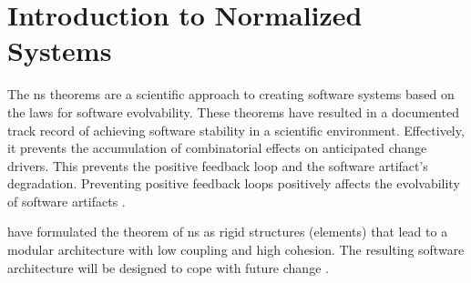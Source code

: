 \section{Introduction to Normalized Systems} \label{sec_inro_ns}

The \gls{ns} theorems are a scientific approach to creating software systems
based on the laws for software evolvability. These theorems have resulted in a documented
track record of achieving software stability in a scientific environment. Effectively, it
prevents the accumulation of combinatorial effects on anticipated change drivers. This
prevents the positive feedback loop and the software artifact's degradation.  Preventing
positive feedback loops positively affects the evolvability of software artifacts
\parencite[]{mannaert_normalized_2009}. 

\citeauthor[]{mannaert_normalized_2009} have formulated the theorem of \gls{ns}
as rigid structures (elements) that lead to a modular architecture with low
coupling and high cohesion. The resulting software architecture will be designed to cope
with future change \parencites[]{mannaert_normalized_2009}.
